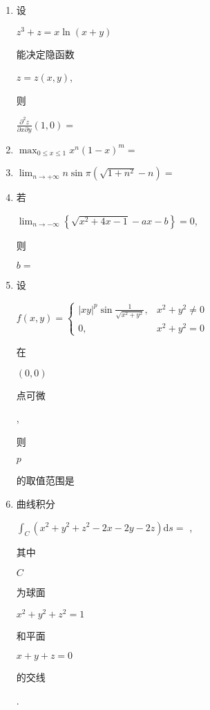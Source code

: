 \documentclass[10pt]{article}
\begin{document}
\begin{enumerate}
  \item \begin{CJK}{UTF8}{mj}设\end{CJK} $z^{3}+z=x \ln (x+y)$ \begin{CJK}{UTF8}{mj}能决定隐函数\end{CJK} $z=z(x, y)$, \begin{CJK}{UTF8}{mj}则\end{CJK} $\frac{\partial^{2} z}{\partial x \partial y}(1,0)=$

  \item $\max _{0 \leqslant x \leqslant 1} x^{n}(1-x)^{m}=$

  \item $\lim _{n \rightarrow+\infty} n \sin \pi\left(\sqrt{1+n^{2}}-n\right)=$

  \item \begin{CJK}{UTF8}{mj}若\end{CJK} $\lim _{n \rightarrow-\infty}\left\{\sqrt{x^{2}+4 x-1}-a x-b\right\}=0$, \begin{CJK}{UTF8}{mj}则\end{CJK} $b=$

  \item \begin{CJK}{UTF8}{mj}设\end{CJK} $f(x, y)=\left\{\begin{array}{ll}|x y|^{p} \sin \frac{1}{\sqrt{x^{2}+y^{2}}}, & x^{2}+y^{2} \neq 0 \\ 0, & x^{2}+y^{2}=0\end{array}\right.$ \begin{CJK}{UTF8}{mj}在\end{CJK} $(0,0)$ \begin{CJK}{UTF8}{mj}点可微\end{CJK}, \begin{CJK}{UTF8}{mj}则\end{CJK} $p$ \begin{CJK}{UTF8}{mj}的取值范围是\end{CJK}

  \item \begin{CJK}{UTF8}{mj}曲线积分\end{CJK} $\int_{C}\left(x^{2}+y^{2}+z^{2}-2 x-2 y-2 z\right) \mathrm{d} s=$ , \begin{CJK}{UTF8}{mj}其中\end{CJK} $C$ \begin{CJK}{UTF8}{mj}为球面\end{CJK} $x^{2}+y^{2}+z^{2}=1$ \begin{CJK}{UTF8}{mj}和平面\end{CJK} $x+y+z=0$ \begin{CJK}{UTF8}{mj}的交线\end{CJK}.


\end{enumerate}
\end{document}

